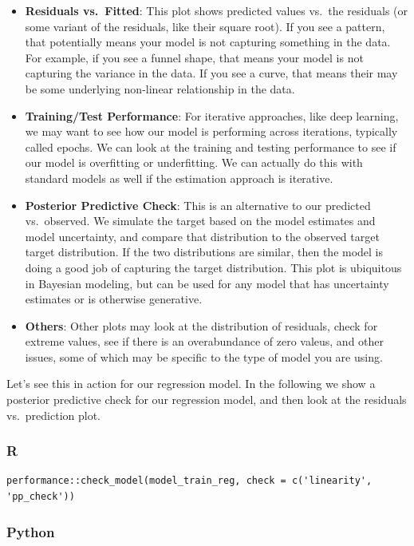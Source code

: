 \documentclass[
  letterpaper,
]{krantz}
\begin{document}
\begin{itemize}
\item
  \textbf{Residuals vs.~Fitted}: This plot shows predicted values
  vs.~the residuals (or some variant of the residuals, like their square
  root). If you see a pattern, that potentially means your model is not
  capturing something in the data. For example, if you see a funnel
  shape, that means your model is not capturing the variance in the
  data. If you see a curve, that means their may be some underlying
  non-linear relationship in the data.
\item
  \textbf{Training/Test Performance}: For iterative approaches, like
  deep learning, we may want to see how our model is performing across
  iterations, typically called epochs. We can look at the training and
  testing performance to see if our model is overfitting or
  underfitting. We can actually do this with standard models as well if
  the estimation approach is iterative.
\item
  \textbf{Posterior Predictive Check}: This is an alternative to our
  predicted vs.~observed. We simulate the target based on the model
  estimates and model uncertainty, and compare that distribution to the
  observed target target distribution. If the two distributions are
  similar, then the model is doing a good job of capturing the target
  distribution. This plot is ubiquitous in Bayesian modeling, but can be
  used for any model that has uncertainty estimates or is otherwise
  generative.
\item
  \textbf{Others}: Other plots may look at the distribution of
  residuals, check for extreme values, see if there is an overabundance
  of zero valeus, and other issues, some of which may be specific to the
  type of model you are using.
\end{itemize}

Let's see this in action for our regression model. In the following we
show a posterior predictive check for our regression model, and then
look at the residuals vs.~prediction plot.

\subsubsection{R}

\begin{verbatim}
performance::check_model(model_train_reg, check = c('linearity', 'pp_check'))
\end{verbatim}

\subsubsection{Python}
\end{document}
